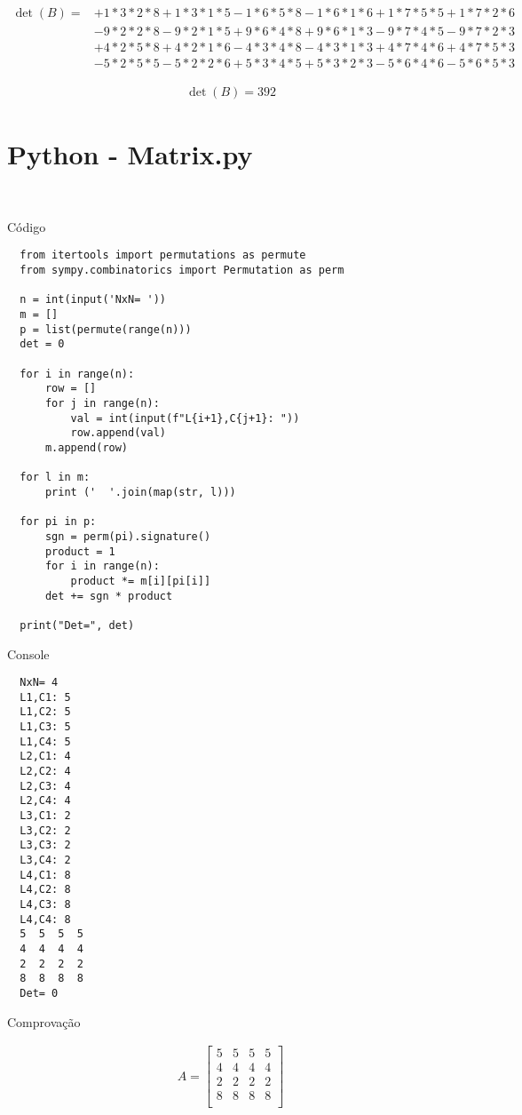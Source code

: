 \documentclass{article}
\begin{document}
\begin{align*}
  \det(B)=&+1*3*2*8+1*3*1*5-1*6*5*8-1*6*1*6+1*7*5*5+1*7*2*6 \\
  &-9*2*2*8-9*2*1*5+9*6*4*8+9*6*1*3-9*7*4*5-9*7*2*3 \\
  &+4*2*5*8+4*2*1*6-4*3*4*8-4*3*1*3+4*7*4*6+4*7*5*3 \\
  &-5*2*5*5-5*2*2*6+5*3*4*5+5*3*2*3-5*6*4*6-5*6*5*3
\end{align*}

\begin{align*}
  \det(B)=392
\end{align*}

\pagebreak

\section{Python - Matrix.py}\

{\Large Código}

\begin{verbatim}
  from itertools import permutations as permute
  from sympy.combinatorics import Permutation as perm
  
  n = int(input('NxN= '))
  m = []
  p = list(permute(range(n)))
  det = 0
  
  for i in range(n):
      row = []
      for j in range(n):
          val = int(input(f"L{i+1},C{j+1}: "))
          row.append(val)
      m.append(row)
  
  for l in m:
      print ('  '.join(map(str, l)))
  
  for pi in p:
      sgn = perm(pi).signature()
      product = 1
      for i in range(n):
          product *= m[i][pi[i]]
      det += sgn * product
  
  print("Det=", det)
\end{verbatim}

{\Large Console}

\begin{verbatim}
  NxN= 4
  L1,C1: 5
  L1,C2: 5
  L1,C3: 5
  L1,C4: 5
  L2,C1: 4
  L2,C2: 4
  L2,C3: 4
  L2,C4: 4
  L3,C1: 2
  L3,C2: 2
  L3,C3: 2
  L3,C4: 2
  L4,C1: 8
  L4,C2: 8
  L4,C3: 8
  L4,C4: 8
  5  5  5  5
  4  4  4  4
  2  2  2  2
  8  8  8  8
  Det= 0
\end{verbatim}

{\Large Comprovação}

\begin{align*}
  A = \begin{bmatrix}
    5 & 5 & 5 & 5 \\
    4 & 4 & 4 & 4 \\
    2 & 2 & 2 & 2 \\
    8 & 8 & 8 & 8 \\
    \end{bmatrix}
\end{align*}
\end{document}
